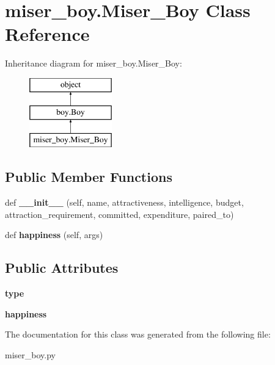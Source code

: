\hypertarget{classmiser__boy_1_1_miser___boy}{}\section{miser\+\_\+boy.\+Miser\+\_\+\+Boy Class Reference}
\label{classmiser__boy_1_1_miser___boy}
Inheritance diagram for miser\+\_\+boy.\+Miser\+\_\+\+Boy\+:\begin{figure}[H]
\begin{center}
\leavevmode
\includegraphics[height=3.000000cm]{classmiser__boy_1_1_miser___boy}
\end{center}
\end{figure}
\subsection*{Public Member Functions}
\begin{DoxyCompactItemize}
\item 
\mbox{\label{classmiser__boy_1_1_miser___boy_a5d920fd6f24fcf5c7308e4f8e785c174}} 
def {\bfseries \+\_\+\+\_\+init\+\_\+\+\_\+} (self, name, attractiveness, intelligence, budget, attraction\+\_\+requirement, committed, expenditure, paired\+\_\+to)
\item 
\mbox{\label{classmiser__boy_1_1_miser___boy_a796e7ead0e4d390d3d27aa8ef6802840}} 
def {\bfseries happiness} (self, args)
\end{DoxyCompactItemize}
\subsection*{Public Attributes}
\begin{DoxyCompactItemize}
\item 
\mbox{\label{classmiser__boy_1_1_miser___boy_a2380dbb7e2289a7556b8bc9eb1e24466}} 
{\bfseries type}
\item 
\mbox{\label{classmiser__boy_1_1_miser___boy_acb776c80b3541f1efe5f66c81a8c4524}} 
{\bfseries happiness}
\end{DoxyCompactItemize}


The documentation for this class was generated from the following file\+:\begin{DoxyCompactItemize}
\item 
miser\+\_\+boy.\+py\end{DoxyCompactItemize}
